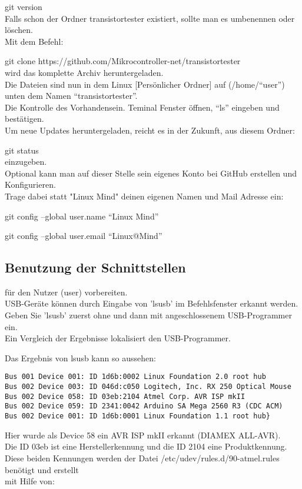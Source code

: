 git version\\
Falls schon der Ordner transistortester existiert, sollte man es umbenennen oder löschen.\\
Mit dem Befehl:   

git clone https://github.com/Mikrocontroller-net/transistortester\\
wird das komplette Archiv heruntergeladen.\\
Die Dateien sind nun in dem Linux [Persönlicher Ordner] auf (/home/"`user"') unten dem Namen "`transistortester"'.\\
Die Kontrolle des Vorhandensein. Teminal Fenster öffnen, "`ls"' eingeben und bestätigen.\\
Um neue Updates heruntergeladen, reicht es in der Zukunft, aus diesem Ordner:

git status\\
einzugeben.\\
Optional kann man auf dieser Stelle sein eigenes Konto bei GitHub erstellen und Konfigurieren.\\
Trage dabei statt "Linux Mind" deinen eigenen Namen und Mail Adresse ein:

 git config --global user.name "`Linux Mind"'
 
git config --global user.email "`Linux@Mind"'


\subsection{Benutzung der Schnittstellen}
\label{sec:Schnittstellen}

für den Nutzer (user) vorbereiten.\\
USB-Geräte können durch Eingabe von 'lsusb' im Befehlsfenster erkannt werden.
Geben Sie 'lsusb' zuerst ohne und dann mit angeschlossenem USB-Programmer ein.\\
Ein Vergleich der Ergebnisse lokalisiert den USB-Programmer.

Das Ergebnis von lsusb kann so aussehen:
\begin{footnotesize}
\begin{verbatim}
Bus 001 Device 001: ID 1d6b:0002 Linux Foundation 2.0 root hub
Bus 002 Device 003: ID 046d:c050 Logitech, Inc. RX 250 Optical Mouse
Bus 002 Device 058: ID 03eb:2104 Atmel Corp. AVR ISP mkII
Bus 002 Device 059: ID 2341:0042 Arduino SA Mega 2560 R3 (CDC ACM)
Bus 002 Device 001: ID 1d6b:0001 Linux Foundation 1.1 root hub}
\end{verbatim}
\end{footnotesize}
Hier wurde als Device 58 ein AVR ISP mkII erkannt (DIAMEX ALL-AVR).\\
Die ID 03eb ist eine Herstellerkennung und die ID 2104 eine Produktkennung.\\
Diese beiden Kennungen werden der Datei /etc/udev/rules.d/90-atmel.rules benötigt und erstellt\\
mit Hilfe von:

